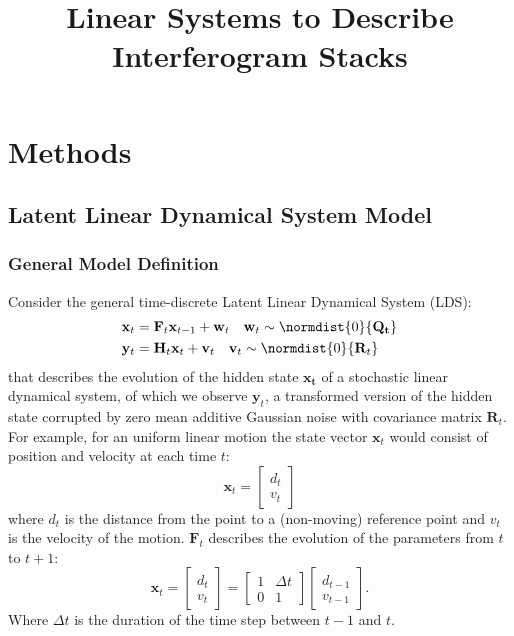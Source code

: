 \documentclass{article}
\title{Linear Systems to Describe Interferogram Stacks}
\begin{document}
\maketitle

\section{Methods}
\subsection{Latent Linear Dynamical System Model }\label{sec:displacement_model}
\subsubsection{General Model Definition}
Consider the general time-discrete Latent Linear Dynamical System (LDS)\cite{Barber2011}:
\begin{equation}\label{eq:state_recursion}
	\begin{aligned}
		\mathbf{x}_t &= \mathbf{F}_t \mathbf{x}_{t-1} + \mathbf{w}_t \quad \mathbf{w}_t \sim \normdist{0}{\mathbf{Q_t}} \\
		\mathbf{y}_{t} &= \mathbf{H}_{t}  \mathbf{x}_{t} + \mathbf{v}_t \quad \mathbf{v}_t   \sim \normdist{0}{\mathbf{R}_t}
	\end{aligned}
\end{equation}
that describes the evolution of the hidden state $\mathbf{x_t}$ of a stochastic linear dynamical system, of which we observe $\mathbf{y}_t$, a transformed version of the hidden state corrupted by zero mean additive Gaussian noise with covariance matrix $\mathbf{R}_t$. \\
For example, for an uniform linear motion the state vector $\mathbf{x}_t$ would consist of position and velocity at each time $t$:
\begin{equation}\label{eq:simplified_state}
\mathbf{x}_t = 
	\begin{bmatrix}
		d_{t}\\
		v_{t}
	\end{bmatrix}
\end{equation}
where $d_t$ is the distance from the point to a (non-moving) reference point and $v_t$ is the velocity of the motion. $\mathbf{F}_t$ describes the evolution of the parameters from $t$ to $t+1$: 
\begin{equation}\label{eq:simplified_F}
	\mathbf{x}_t = 
		\begin{bmatrix}
			d_{t}\\
			v_{t}
		\end{bmatrix} =
		\begin{bmatrix}
		1 & \Delta t\\
		0 & 1
		\end{bmatrix}
		\begin{bmatrix}
			d_{t-1}\\
			v_{t-1}
		\end{bmatrix}.
\end{equation}
Where $\Delta t$ is the duration of the time step between $t-1$ and $t$.\\
\end{document}
